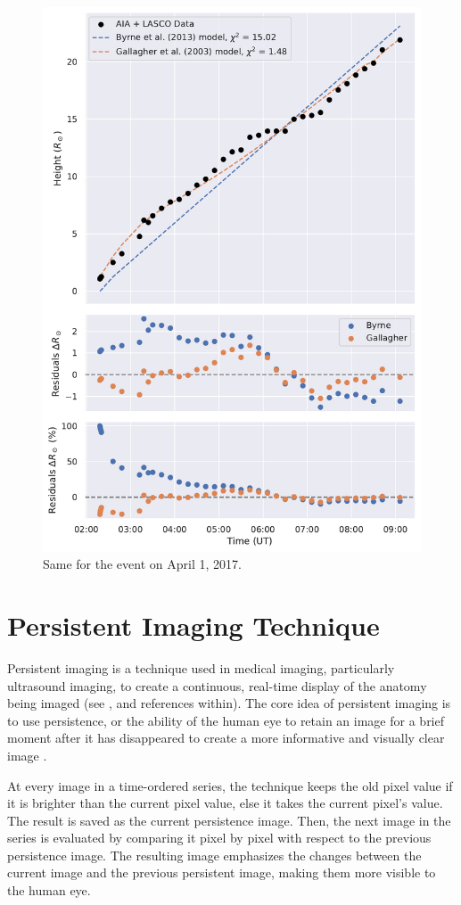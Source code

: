 \begin{figure}[!htp]
	\centering
	\includegraphics[width=0.8\hsize]{chapter2/figs/appendix/height_profile_residuals_aia_lasco_170401_01.pdf}
	\caption{Same for the event on April 1, 2017.}
\end{figure}

\section{Persistent Imaging Technique}
\label{ch3_append_a}
Persistent imaging is a technique used in medical imaging, particularly ultrasound imaging, to create a continuous, real-time display of the anatomy being imaged (see \citeauthor{pysz_2011} \citeyear{pysz_2011}, and references within). The core idea of persistent imaging is to use persistence, or the ability of the human eye to retain an image for a brief moment after it has disappeared to create a more informative and visually clear image \citep{fredkin_1995, thompson_2016}.

At every image in a time-ordered series, the technique keeps the old pixel value if it is brighter than the current pixel value, else it takes the current pixel's value. The result is saved as the current persistence image. Then, the next image in the series is evaluated by comparing it pixel by pixel with respect to the previous persistence image. The resulting image emphasizes the changes between the current image and the previous persistent image, making them more visible to the human eye.

